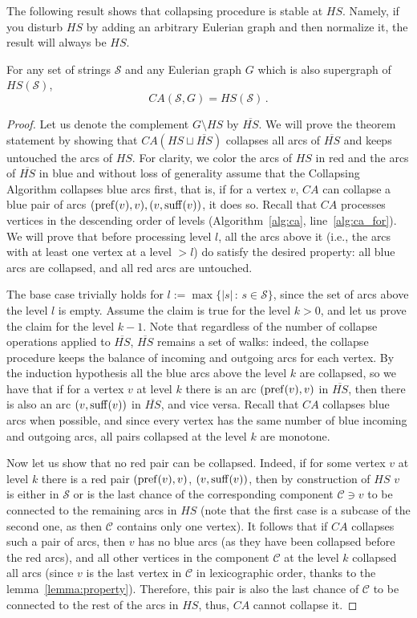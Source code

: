 The following result shows that collapsing procedure is stable at $HS$. Namely, if you disturb $HS$ by adding an arbitrary Eulerian graph and then normalize it, the result will always be $HS$.
\begin{theorem}
For any set of strings $\mathcal{S}$ and any Eulerian graph $G$ which is also supergraph of $HS(\mathcal{S})$,
\[
			CA(\mathcal{S}, G) = HS(\mathcal{S}) \, .
\]
\end{theorem}
\begin{proof}
Let us denote the complement $G \setminus HS$ by $\overline{HS}$. We will prove the theorem statement by showing that $CA(HS \sqcup \overline{HS})$ collapses all arcs of $\overline{HS}$ and keeps untouched the arcs of $HS$.  For clarity, we color the arcs of $HS$ in red and the arcs of $\overline{HS}$ in blue and without loss of generality assume that the Collapsing Algorithm collapses blue arcs first, that is, if for a vertex $v$, $CA$ can collapse a blue pair of arcs $(\operatorname{pref}(v), v), (v, \operatorname{suff}(v))$, it does so. Recall that $CA$ processes vertices in the descending order of levels (Algorithm~\ref{alg:ca}, line~\ref{alg:ca_for}). We will prove that before processing level $l$, all the arcs above it (i.e., the arcs with at least one vertex at a level  $>l$) do satisfy the desired property: all blue arcs are collapsed, and all red arcs are untouched.

The base case trivially holds for $l := \max\{|s| \, : \, s\in\mathcal{S}\}$, since the set of arcs above the level $l$ is empty. Assume the claim is true for the level $k > 0$, and let us prove the claim for the level $k - 1$. Note that regardless of the number of collapse operations applied to $\overline{HS}$, $\overline{HS}$ remains a set of walks: indeed, the collapse procedure keeps the balance of incoming and outgoing arcs for each vertex. By the induction hypothesis all the blue arcs above the level $k$ are collapsed, so we have that if for a vertex $v$ at level $k$ there is an arc $(\operatorname{pref}(v), v)$ in $\overline{HS}$, then there is also an arc $(v, \operatorname{suff}(v))$ in $\overline{HS}$, and vice versa. Recall that $CA$ collapses blue arcs when possible, and since every vertex has the same number of blue incoming and outgoing arcs, all pairs collapsed at the level $k$ are monotone. 
	
Now let us show that no red pair can be collapsed. Indeed, if for some vertex $v$ at level $k$ there is a red pair $(\operatorname{pref}(v), v)$, $(v, \operatorname{suff}(v))$, then by construction of $HS$ $v$ is either in $\mathcal{S}$ or is the last chance of the corresponding component $\mathcal{C} \ni v$ to be connected to the remaining arcs in $HS$ (note that the first case is a subcase of the second one, as then $\mathcal{C}$ contains only one vertex). It follows that if $CA$ collapses such a pair of arcs, then $v$ has no blue arcs (as they have been collapsed before the red arcs), and all other vertices in the component $\mathcal{C}$ at the level $k$ collapsed all arcs (since $v$ is the last vertex in $\mathcal{C}$ in lexicographic order, thanks to the lemma~\ref{lemma:property}). Therefore, this pair is also the last chance of $\mathcal{C}$ to be connected to the rest of the arcs in $HS$, thus, $CA$ cannot collapse it.
	

\end{proof}
